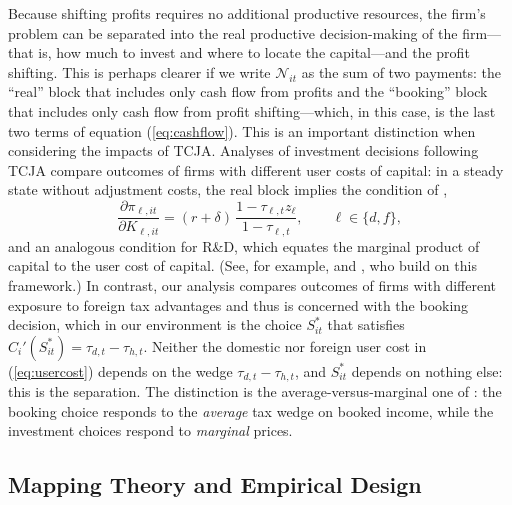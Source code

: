 \documentclass[11pt,letterpaper]{article}
\begin{document}
Because shifting profits requires no 
additional productive resources, the firm's problem can be
separated into the real productive decision-making of the firm---that is,
how much to invest and where to locate the capital---and the profit 
shifting. This is perhaps clearer if we write $\mathcal{N}_{it}$ 
as the sum of two payments: the ``real'' block that includes only cash flow
from profits and the ``booking'' block that includes
only cash flow from profit shifting---which, in this case, is the last
two terms of equation (\ref{eq:cashflow}).
This is an important distinction when considering the impacts of TCJA.
Analyses of investment decisions following TCJA
compare outcomes of firms with different user costs of capital:
in a steady state without adjustment costs, the real block implies the
condition of \citet{HallJorgenson1967},
\begin{equation}
  \frac{\partial \pi_{\ell,it}}{\partial K_{\ell,it}}
   = (r+\delta)\,\frac{1-\tau_{\ell,t} z_\ell}{1-\tau_{\ell,t}},
   \qquad \ell\in\{d,f\},
\label{eq:usercost}
\end{equation}
and an analogous condition for R\&D, which equates
the marginal product of capital to the user cost of capital.
(See, for example, \citet{CSZZ2024} and \citet{GravelleMarples2025},
who build on this framework.)
In contrast, our analysis compares outcomes of firms with different exposure
to foreign tax advantages and thus is concerned with the booking
decision, which in our environment is the choice
$S^*_{it}$ that satisfies $C_i'(S^*_{it})=\tau_{d,t}-\tau_{h,t}$.
Neither the domestic nor foreign user cost in  (\ref{eq:usercost})
depends on the wedge $\tau_{d,t}-\tau_{h,t}$,
and $S^*_{it}$ depends on nothing else: this is the separation.
The distinction is the average-versus-marginal one of
\citet{DevereuxGriffith2003}: the booking choice responds to the
\emph{average} tax wedge on booked income, while the investment
choices respond to \emph{marginal} prices.

\subsection{Mapping Theory and Empirical Design}
\end{document}
